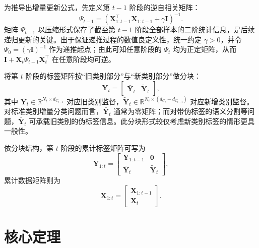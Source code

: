 为推导出增量更新公式，先定义第 $t-1$ 阶段的逆自相关矩阵：
\begin{equation}
\Psi_{t-1}=\left(\mathbf{X}_{1:t-1}^\top\mathbf{X}_{1:t-1}+\gamma\mathbf{I}\right)^{-1}.
\label{eq:psi_def_report}
\end{equation}
矩阵 $\Psi_{t-1}$ 以压缩形式保存了截至第 $t-1$ 阶段全部样本的二阶统计信息，是后续递归更新的关键。出于保证递推过程的数值良定义性，统一约定 $\gamma>0$，并令 $\Psi_0=(\gamma\mathbf{I})^{-1}$ 作为递推起点；由此可知任意阶段的 $\Psi_t$ 均为正定矩阵，从而 $\mathbf{I}+\mathbf{X}_t\Psi_{t-1}\mathbf{X}_t^\top$ 在任意阶段均可逆。

将第 $t$ 阶段的标签矩阵按“旧类别部分”与“新类别部分”做分块：
\begin{equation}
\mathbf{Y}_t=
\begin{bmatrix}
\bar{\mathbf{Y}}_t & \tilde{\mathbf{Y}}_t
\end{bmatrix},
\label{eq:y_split_report}
\end{equation}
其中 $\bar{\mathbf{Y}}_t\in\mathbb{R}^{N_t\times d_{C_{t-1}}}$ 对应旧类别监督，$\tilde{\mathbf{Y}}_t\in\mathbb{R}^{N_t\times (d_{C_t}-d_{C_{t-1}})}$ 对应新增类别监督。对标准类别增量分类问题而言，$\bar{\mathbf{Y}}_t$ 通常为零矩阵；而对带伪标签的语义分割等问题，$\bar{\mathbf{Y}}_t$ 可承载旧类别的伪标签信息。此分块形式较仅考虑新类别标签的情形更具一般性。

依分块结构，第 $t$ 阶段的累计标签矩阵可写为
\begin{equation}
\mathbf{Y}_{1:t}=
\begin{bmatrix}
\mathbf{Y}_{1:t-1} & \mathbf{0} \\
\bar{\mathbf{Y}}_t & \tilde{\mathbf{Y}}_t
\end{bmatrix},
\label{eq:y_concat_report}
\end{equation}
累计数据矩阵则为
\begin{equation}
\mathbf{X}_{1:t}=
\begin{bmatrix}
\mathbf{X}_{1:t-1} \\ \mathbf{X}_t
\end{bmatrix}.
\label{eq:x_concat_report}
\end{equation}

\section{核心定理}

